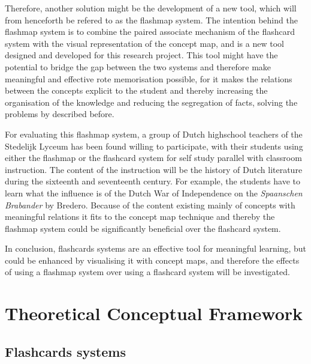
Therefore, another solution might be the development of a new tool, which will from henceforth be refered to as the flashmap system. The intention behind the flashmap system is to combine the paired associate mechanism of the flashcard system with the visual representation of the concept map, and is a new tool designed and developed for this research project. This tool might have the potential to bridge the gap between the two systems and therefore make meaningful and effective rote memorisation possible, for it makes the relations between the concepts explicit to the student and thereby increasing the organisation of the knowledge and reducing the segregation of facts, solving the problems by  described before.

For evaluating this flashmap system, a group of Dutch highschool teachers of the Stedelijk Lyceum has been found willing to participate, with their students using either the flashmap or the flashcard system for self study parallel with classroom instruction. The content of the instruction will be the history of Dutch literature during the sixteenth and seventeenth century. For example, the students have to learn what the influence is of the Dutch War of Independence on the \emph{Spaanschen Brabander} by Bredero. Because of the content existing mainly of concepts with meaningful relations it fits to the concept map technique and thereby the flashmap system could be significantly beneficial over the flashcard system.


In conclusion, flashcards systems are an effective tool for meaningful learning, but could be enhanced by visualising it with concept maps, and therefore the effects of using a flashmap system over using a flashcard system will be investigated. 

\section{Theoretical Conceptual Framework}


\subsection{Flashcards systems}

